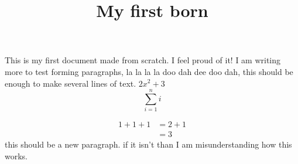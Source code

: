 \documentclass[11pt]{ximera}
\title{My first born}
\begin{document}
This is my first \LaTex document made  from scratch. I feel proud of it!  I am writing more to test forming paragraphs, la la la la doo dah dee doo dah, this should be enough to make several lines of text. $2x^2+3$
\[
\sum_{i=1}^n i
\]

\begin{align*}
1+1+1 &= 2+1\\
&=3
\end{align*}
this should be a new paragraph. if it isn't than I am misunderstanding how this works.
\end{document}
